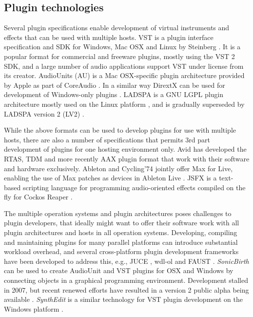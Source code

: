 \documentclass{article}
\begin{document}




\subsection{Plugin technologies}\label{sec:plugin-technologies}

Several plugin specifications enable development of virtual instruments and effects that can be used with multiple hosts.
VST is a plugin interface specification and SDK for Windows, Mac OSX and Linux by Steinberg \cite{steinberg:2014vst}.
It is a popular format for commercial and freeware plugins, mostly using the VST 2 SDK, and a large number of audio applications support VST under license from its creator.
AudioUnits (AU) is a Mac OSX-specific plugin architecture provided by Apple as part of CoreAudio \cite{apple2014:au}.
In a similar way DirextX can be used for development of Windows-only plugins \cite{microsoft2014:directX}.
LADSPA is a GNU LGPL plugin architecture mostly used on the Linux platform \cite{furse:2007ladspa}, and is gradually superseded by LADSPA version 2 (LV2) \cite{lv2:2014}.

While the above formats can be used to develop plugins for use with multiple hosts, there are also a number of specifications that permits 3rd part development of plugins for one hosting environment only.
Avid has developed the RTAS, TDM and more recently AAX plugin format that work with their software and hardware exclusively.
Ableton and Cycling'74 jointly offer Max for Live, enabling the use of Max patches as devices in Ableton Live \cite{ableton:2014maxforlive}. JSFX is a text-based scripting language for programming audio-oriented effects compiled on the fly for Cockos Reaper \cite{cockos:2014jsfx,cockos:2014reaper}.

The multiple operation systems and plugin architectures poses challenges to plugin developers, that ideally might want to offer their software work with all plugin architectures and hosts in all operation systems.
Developing, compiling and maintaining plugins for many parallel platforms can introduce substantial workload overhead, and several cross-platform plugin development frameworks have been developed to address this, e.g.,  JUCE \cite{juce2014}, wdl-ol \cite{larkin2014wdl-ol} and FAUST \cite{smithFaust:2012}. 
\emph{SonicBirth} can be used to create AudioUnit and VST plugins for OSX and Windows by connecting objects in a graphical programming environment. Development stalled in 2007, but recent renewed efforts have resulted in a version 2 public alpha being available \cite{sonicbirth2014}.
\emph{SynthEdit} is a similar technology for VST plugin development on the Windows platform \cite{synthedit2011}.
\end{document}
